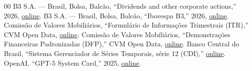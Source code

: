 \documentclass[10pt,conference]{IEEEtran}
\begin{document}
\begin{thebibliography}{00}
 B3 S.A. --- Brasil, Bolsa, Balc\~ao, ``Dividends and other corporate actions,'' 2026, \href{https://sistemaswebb3-listados.b3.com.br/dividensOtherCorpActPage/}{online}.
 B3 S.A. --- Brasil, Bolsa, Balc\~ao, ``Ibovespa B3,'' 2026, \href{https://www.b3.com.br/pt_br/market-data-e-indices/indices/indices-amplos/ibovespa.htm}{online}.
 Comiss\~ao de Valores Mobili\'arios, ``Formul\'ario de Informa\c{c}\~oes Trimestrais (ITR),'' CVM Open Data, \href{https://dados.cvm.gov.br/dados/CIA_ABERTA/DOC/ITR/DADOS/}{online}.
 Comiss\~ao de Valores Mobili\'arios, ``Demonstra\c{c}\~oes Financeiras Padronizadas (DFP),'' CVM Open Data, \href{https://dados.cvm.gov.br/dataset/cia_aberta-doc-dfp}{online}.
 Banco Central do Brasil, ``Sistema Gerenciador de S\'eries Temporais, s\'erie 12 (CDI),'' \href{https://www3.bcb.gov.br/sgspub/}{online}.
 OpenAI, ``GPT-5 System Card,'' 2025, \href{https://openai.com/index/gpt-5-system-card/}{online}.
\end{thebibliography}
\end{document}
